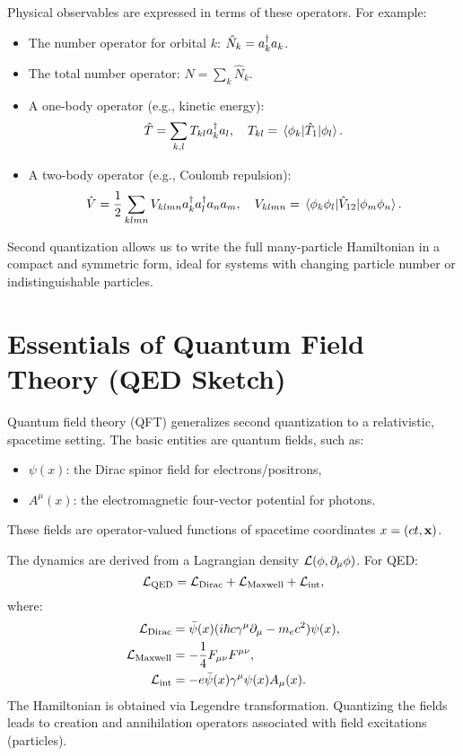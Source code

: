 Physical observables are expressed in terms of these operators. For example:
\begin{itemize}
	\item The number operator for orbital \(k\): \(\hat{N}_k = a^\dagger_{k} a_{k}\).
	\item The total number operator: \(\hat{N} = \sum_k \hat{N}_k\).
	\item A one-body operator (e.g., kinetic energy): 
	\[
	\hat{T} = \sum_{k,l} T_{kl} a^\dagger_{k} a_{l}, \quad T_{kl} = \mel{\phi_k}{\hat{T}_1}{\phi_l}.
	\]
	\item A two-body operator (e.g., Coulomb repulsion):
	\[
	\hat{V} = \frac{1}{2} \sum_{klmn} V_{klmn} a^\dagger_{k} a^\dagger_{l} a_{n} a_{m}, \quad
	V_{klmn} = \mel{\phi_k \phi_l}{\hat{V}_{12}}{\phi_m \phi_n}.
	\]
\end{itemize}

Second quantization allows us to write the full many-particle Hamiltonian in a compact and symmetric form, ideal for systems with changing particle number or indistinguishable particles.

\section{Essentials of Quantum Field Theory (QED Sketch)}
\label{sec:foundations_qft}

Quantum field theory (QFT) generalizes second quantization to a relativistic, spacetime setting. The basic entities are quantum fields, such as:
\begin{itemize}
	\item \(\psi(x)\): the Dirac spinor field for electrons/positrons,
	\item \(A^\mu(x)\): the electromagnetic four-vector potential for photons.
\end{itemize}
These fields are operator-valued functions of spacetime coordinates \(x = (ct, \vb{x})\).

The dynamics are derived from a Lagrangian density \(\mathcal{L}(\phi, \partial_\mu \phi)\). For QED:
\begin{equation}
	\mathcal{L}_{\text{QED}} = \mathcal{L}_{\text{Dirac}} + \mathcal{L}_{\text{Maxwell}} + \mathcal{L}_{\text{int}},
\end{equation}
where:
\begin{align*}
	\mathcal{L}_{\text{Dirac}} &= \bar{\psi}(x)(i\hbar c \gamma^\mu \partial_\mu - m_e c^2)\psi(x), \\
	\mathcal{L}_{\text{Maxwell}} &= -\frac{1}{4} F_{\mu\nu}F^{\mu\nu}, \\
	\mathcal{L}_{\text{int}} &= -e \bar{\psi}(x)\gamma^\mu \psi(x) A_\mu(x).
\end{align*}
The Hamiltonian is obtained via Legendre transformation. Quantizing the fields leads to creation and annihilation operators associated with field excitations (particles).

